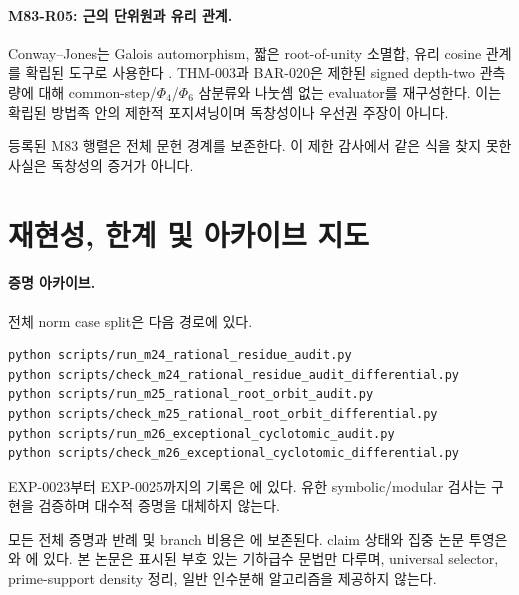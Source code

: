 \documentclass[11pt]{article}
\begin{document}
\paragraph{M83-R05: 근의 단위원과 유리 관계.}
Conway--Jones는 Galois automorphism, 짧은 root-of-unity 소멸합,
유리 cosine 관계를 확립된 도구로 사용한다
\cite{conway1976trigonometric}. THM-003과 BAR-020은 제한된 signed
depth-two 관측량에 대해 common-step/\(\Phi_4\)/\(\Phi_6\) 삼분류와
나눗셈 없는 evaluator를 재구성한다. 이는 확립된 방법족 안의 제한적
포지셔닝이며 독창성이나 우선권 주장이 아니다.

등록된 M83 행렬은 전체 문헌 경계를 보존한다. 이 제한 감사에서 같은
식을 찾지 못한 사실은 독창성의 증거가 아니다.

\section{재현성, 한계 및 아카이브 지도}
\label{app:cyclotomic-reproduction}

\paragraph{증명 아카이브.}
전체 norm case split은 다음 경로에 있다.
\par\smallskip
\noindent\begin{minipage}{\linewidth}
\raggedright\small
{}
\end{minipage}

\begin{verbatim}
python scripts/run_m24_rational_residue_audit.py
python scripts/check_m24_rational_residue_audit_differential.py
python scripts/run_m25_rational_root_orbit_audit.py
python scripts/check_m25_rational_root_orbit_differential.py
python scripts/run_m26_exceptional_cyclotomic_audit.py
python scripts/check_m26_exceptional_cyclotomic_differential.py
\end{verbatim}
EXP-0023부터 EXP-0025까지의 기록은
에 있다. 유한 symbolic/modular 검사는
구현을 검증하며 대수적 증명을 대체하지 않는다.

모든 전체 증명과 반례 및 branch 비용은 \archivepaper{}에 보존된다.
claim 상태와 집중 논문 투영은 와
에 있다. 본 논문은 표시된
부호 있는 기하급수 문법만 다루며, universal selector, prime-support
density 정리, 일반 인수분해 알고리즘을 제공하지 않는다.


\small

\end{document}
